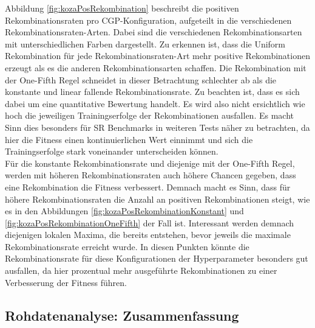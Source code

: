Abbildung \ref{fig:kozaPosRekombination} beschreibt die positiven Rekombinationsraten pro CGP-Konfiguration, aufgeteilt in die verschiedenen Rekombinationsraten-Arten. 
Dabei sind die verschiedenen Rekombinationsarten mit unterschiedlichen Farben dargestellt.
Zu erkennen ist, dass die Uniform Rekombination für jede Rekombinationsraten-Art mehr positive Rekombinationen erzeugt als es die anderen Rekombinationsarten schaffen.
Die Rekombination mit der One-Fifth Regel schneidet in dieser Betrachtung schlechter ab als die konstante und linear fallende Rekombinationsrate.
Zu beachten ist, dass es sich dabei um eine quantitative Bewertung handelt.
Es wird also nicht ersichtlich wie hoch die jeweiligen Trainingserfolge der Rekombinationen ausfallen.
Es macht Sinn dies besonders für SR Benchmarks in weiteren Tests näher zu betrachten, da hier die Fitness einen kontinuierlichen Wert einnimmt und sich die Trainingserfolge stark voneinander unterscheiden können.\\
Für die konstante Rekombinationsrate und diejenige mit der One-Fifth Regel, werden mit höheren Rekombinationsraten auch höhere Chancen gegeben, dass eine Rekombination die Fitness verbessert.
Demnach macht es Sinn, dass für höhere Rekombinationsraten die Anzahl an positiven Rekombinationen steigt, wie es in den Abbildungen \ref{fig:kozaPosRekombinationKonstant} und \ref{fig:kozaPosRekombinationOneFifth} der Fall ist.
Interessant werden demnach diejenigen lokalen Maxima, die bereits entstehen, bevor jeweils die maximale Rekombinationsrate erreicht wurde.
In diesen Punkten könnte die Rekombinationsrate für diese Konfigurationen der Hyperparameter besonders gut ausfallen, da hier prozentual mehr ausgeführte Rekombinationen zu einer Verbesserung der Fitness führen.


\subsection{Rohdatenanalyse: Zusammenfassung}
\label{subsec:rohdatenZusammenfassung}

